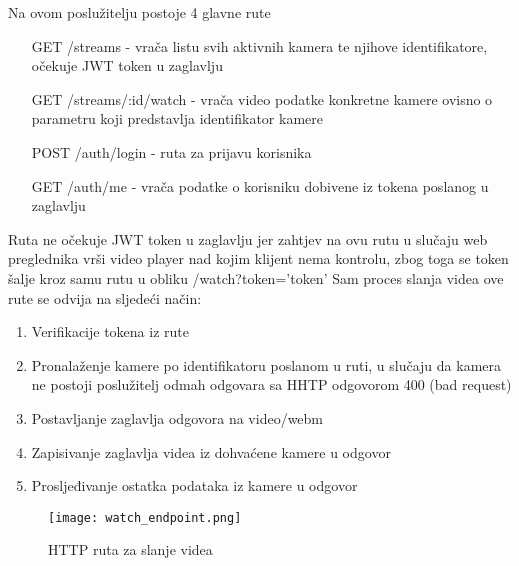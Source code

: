  \label{sec:routes}
Na ovom poslužitelju postoje 4 glavne rute
\begin{itemize}
  \item [GET] /streams - vrača listu svih aktivnih kamera te njihove identifikatore, očekuje JWT token u zaglavlju
  \item [GET] /streams/:id/watch - vrača video podatke konkretne kamere ovisno o \\ 
    parametru  koji predstavlja identifikator kamere
  \item [POST] /auth/login - ruta za prijavu korisnika
  \item [GET] /auth/me - vrača podatke o korisniku dobivene iz tokena poslanog u zaglavlju
\end{itemize}
\noindent
Ruta  ne očekuje JWT token u zaglavlju jer zahtjev na ovu rutu u slučaju web preglednika vrši
 video player nad kojim klijent nema kontrolu, zbog toga se token šalje kroz samu rutu u obliku
/watch?token='token'
\paraBreak
Sam proces slanja videa ove rute se odvija na sljedeći način:
\begin{enumerate}
  \item Verifikacije tokena iz rute
  \item Pronalaženje kamere po identifikatoru poslanom u ruti, u slučaju da kamera ne postoji poslužitelj odmah odgovara
    sa HHTP odgovorom 400 (bad request)
  \item Postavljanje zaglavlja odgovora  na video/webm
  \item Zapisivanje zaglavlja videa iz dohvaćene kamere u odgovor
  \item Prosljeđivanje ostatka podataka iz kamere u odgovor
\end{enumerate}

\begin{figure}[h]
  \texttt{[image: watch\_endpoint.png]}
  \caption{HTTP ruta za slanje videa}
\end{figure}